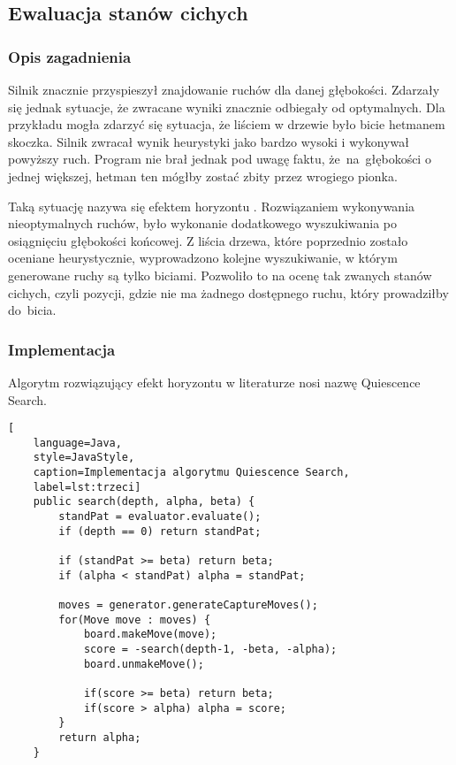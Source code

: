 \subsection{Ewaluacja stanów cichych}
\label{subsec:ewaluacja-cichych-stanow}

\subsubsection{Opis zagadnienia}
Silnik znacznie przyspieszył znajdowanie ruchów dla danej głębokości.
Zdarzały się jednak sytuacje, że zwracane wyniki znacznie odbiegały od optymalnych.
Dla przykładu mogła zdarzyć się sytuacja, że liściem w drzewie było bicie hetmanem skoczka.
Silnik zwracał wynik heurystyki jako bardzo wysoki i wykonywał powyższy ruch.
Program nie brał jednak pod uwagę faktu, że~na~głębokości o jednej większej, hetman ten mógłby zostać zbity przez wrogiego pionka.

Taką sytuację nazywa się efektem horyzontu \cite*{duch}.
Rozwiązaniem wykonywania nieoptymalnych ruchów, było wykonanie dodatkowego wyszukiwania po osiągnięciu głębokości końcowej.
Z liścia drzewa, które poprzednio zostało oceniane heurystycznie, wyprowadzono kolejne wyszukiwanie, w którym generowane ruchy są tylko biciami.
Pozwoliło to na ocenę tak zwanych stanów cichych, czyli pozycji, gdzie nie ma żadnego dostępnego ruchu, który prowadziłby do~bicia.

\subsubsection{Implementacja}

Algorytm rozwiązujący efekt horyzontu w literaturze nosi nazwę Quiescence Search.

\begin{lstlisting}[
    language=Java,
    style=JavaStyle,
    caption=Implementacja algorytmu Quiescence Search,
    label=lst:trzeci]
    public search(depth, alpha, beta) {
        standPat = evaluator.evaluate();
        if (depth == 0) return standPat;

        if (standPat >= beta) return beta;
        if (alpha < standPat) alpha = standPat;

        moves = generator.generateCaptureMoves();
        for(Move move : moves) {
            board.makeMove(move);
            score = -search(depth-1, -beta, -alpha);
            board.unmakeMove();

            if(score >= beta) return beta;
            if(score > alpha) alpha = score;
        }
        return alpha;
    }
\end{lstlisting}

